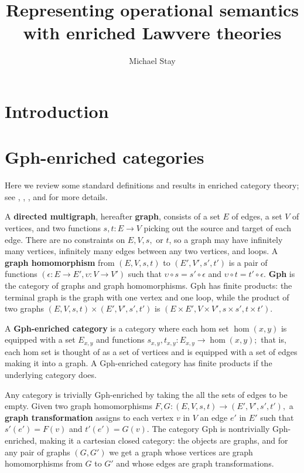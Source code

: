 \documentclass[a4paper,UKenglish]{lipics-v2016}
\title{Representing operational semantics with enriched Lawvere theories}
\author[1]{
Michael Stay\\
}
\affil[1]{
  Pyrofex Corp., Kirkland, WA, USA\\
  {\tt stay@pyrofex.net}
}
\newcommand{\maps}{\colon}
\begin{document}
\maketitle
\begin{abstract}
\noindent
\end{abstract}
\EnableBpAbbreviations

\section{Introduction}
\section{Gph-enriched categories}
Here we review some standard definitions and results in enriched category theory; see \cite{CIS-335497}, \cite{Power99EnrichedLawvereTheories}, \cite{DBLP:journals/acs/LackR11}, and \cite{Trimble} for more details.

A {\bf directed multigraph}, hereafter {\bf graph}, consists of a set $E$ of edges, a set $V$ of vertices, and two functions $s,t\maps E \to V$ picking out the source and target of each edge.  There are no constraints on $E, V, s,$ or $t$, so a graph may have infinitely many vertices, infinitely many edges between any two vertices, and loops.  A {\bf graph homomorphism} from $(E, V, s, t)$ to $(E', V', s', t')$ is a pair of functions $(\epsilon\maps E \to E', \upsilon\maps V \to V')$ such that $\upsilon\circ s = s' \circ \epsilon$ and $\upsilon\circ t = t' \circ \epsilon$.  {\bf Gph} is the category of graphs and graph homomorphisms.  Gph has finite products: the terminal graph is the graph with one vertex and one loop, while the product of two graphs $(E, V, s, t) \times (E', V', s', t')$ is $(E \times E', V \times V', s \times s', t\times t').$

A {\bf Gph-enriched category} is a category where each hom set $\hom(x,y)$ is equipped with a set $E_{x,y}$ and functions $s_{x,y}, t_{x,y}\maps E_{x,y} \to \hom(x,y);$ that is, each hom set is thought of as a set of vertices and is equipped with a set of edges making it into a graph.  A Gph-enriched category has finite products if the underlying category does.

Any category is trivially Gph-enriched by taking the all the sets of edges to be empty.  Given two graph homomorphisms $F, G\maps (E, V, s, t) \to (E', V', s', t'),$ a {\bf graph transformation} assigns to each vertex $v$ in $V$ an edge $e'$ in $E'$ such that $s'(e') = F(v)$ and $t'(e') = G(v).$  The category Gph is nontrivially Gph-enriched, making it a cartesian closed category: the objects are graphs, and for any pair of graphs $(G, G')$ we get a graph whose vertices are graph homomorphisms from $G$ to $G'$ and whose edges are graph transformations.
\end{document}
